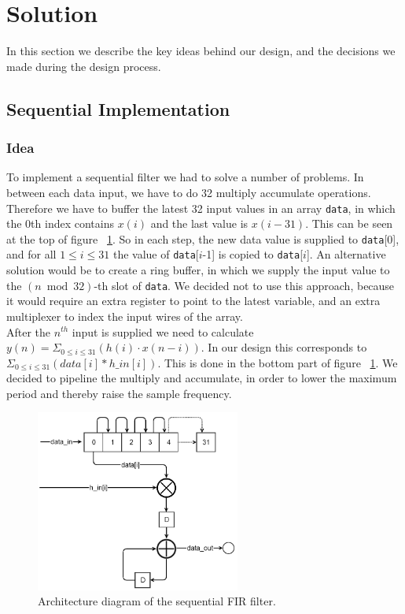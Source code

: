 \section{Solution}
In this section we describe the key ideas behind our design, and the decisions we made during the design process.
\subsection{Sequential Implementation}
\subsubsection{Idea}
To implement a sequential filter we had to solve a number of problems. In between each data input, we have to do 32 multiply accumulate operations. Therefore we have to buffer the latest 32 input values in an array \texttt{data}, in which the 0th index contains $x(i)$ and the last value is $x(i -31)$. This can be seen at the top of figure ~\ref{fig:architecture}. So in each step, the new data value is supplied to \texttt{data}[0], and for all $1 \leq i \leq 31$ the value of \texttt{data}[$i$-1] is copied to \texttt{data}[$i$]. An alternative solution would be to create a ring buffer, in which we supply the input value to the $(n\bmod 32)$-th slot of \texttt{data}. We decided not to use this approach, because it would require an extra register to point to the latest variable, and an extra multiplexer to index the input wires of the array.\\
After the $n^{th}$ input is supplied we need to calculate $y(n)=\Sigma_{0\leq i \leq 31}(h(i)\cdot x(n-i))$. In our design this corresponds to $\Sigma_{0 \leq i \leq 31}(data[i] * h\_in[i])$. This is done in the bottom part of  figure ~\ref{fig:architecture}. We decided to pipeline the multiply and accumulate, in order to lower the maximum period and thereby raise the sample frequency.

\begin{figure}
\begin{center}
\includegraphics[width=0.6\textwidth]{images/architecture.png}
\caption{Architecture diagram of the sequential FIR filter.}
\label{fig:architecture}
\end{center}
\end{figure}

